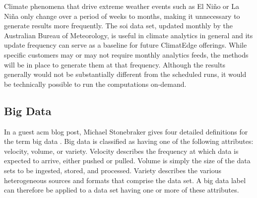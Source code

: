 Climate phenomena that drive extreme weather events such as El Niño or La Niña only change over a period of weeks to months, making it unnecessary to generate results more frequently. The \gls{soi} data set, updated monthly by the Australian Bureau of Meteorology, is useful in climate analytics in general and its update frequency can serve as a baseline for future ClimatEdge offerings. While specific customers may or may not require monthly analytics feeds, the methods will be in place to generate them at that frequency. Although the results generally would not be substantially different from the scheduled runs, it would be technically possible to run the computations on-demand.
\subsection{Big Data}
In a guest \gls{acm} blog post, Michael Stonebraker gives four detailed definitions for the term big data \cite{stonebraker}. Big data is classified as having one of the following attributes: velocity, volume, or variety. Velocity describes the frequency at which data is expected to arrive, either pushed or pulled. Volume is simply the size of the data sets to be ingested, stored, and processed. Variety describes the various heterogeneous sources and formats that comprise the data set. A big data label can therefore be applied to a data set having  one or more of these attributes.\\

